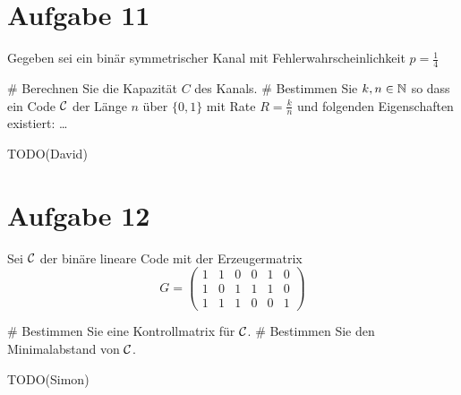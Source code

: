 
\setcounter{MaxMatrixCols}{20}

\section*{Aufgabe 11}
Gegeben sei ein binär symmetrischer Kanal mit Fehlerwahrscheinlichkeit $p = \frac{1}{4}$
\begin{myList}
#
Berechnen Sie die Kapazität $C$ des Kanals.
#
Bestimmen Sie $k,n \in \mathbb{N}$ so dass ein Code $\mathcal{C}$ der Länge $n$ über $\lbrace 0,1 \rbrace$ mit Rate $R = \frac{k}{n}$ und folgenden Eigenschaften existiert: \ldots
\end{myList}
TODO(David)

\section*{Aufgabe 12}
Sei $\mathcal{C}$ der binäre lineare Code mit der Erzeugermatrix
\begin{equation*}
	G = \begin{pmatrix}
		1 & 1 & 0 & 0 & 1 & 0 \\
		1 & 0 & 1 & 1 & 1 & 0 \\
		1 & 1 & 1 & 0 & 0 & 1
	\end{pmatrix}
\end{equation*}
\begin{myList}
#
Bestimmen Sie eine Kontrollmatrix für $\mathcal{C}$.
#
Bestimmen Sie den Minimalabstand von $\mathcal{C}$.
\end{myList}
TODO(Simon)

